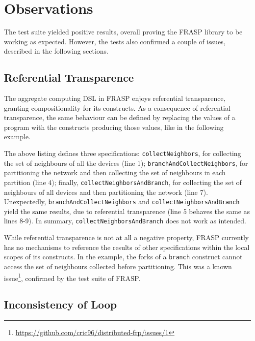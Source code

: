 
\section{Observations}
\label{section:verification:observations}

The test suite yielded positive results, overall proving the FRASP library to
be working as expected. However, the tests also confirmed a couple of issues,
described in the following sections.

\subsection{Referential Transparence}

The aggregate computing \ac{DSL} in FRASP enjoys referential transparence,
granting compositionality for its constructs. As a consequence of referential
transparence, the same behaviour can be defined by replacing the values of a
program with the constructs producing those values, like in the following
example.



The above listing defines three specifications: \texttt{collectNeighbors}, for
collecting the set of neighbours of all the devices (line 1);
\texttt{branchAndCollectNeighbors}, for partitioning the network and then
collecting the set of neighbours in each partition (line 4); finally,
\texttt{collectNeighborsAndBranch}, for collecting the set of neighbours of all
devices and then partitioning the network (line 7). Unexpectedly,
\texttt{branchAndCollectNeighbors} and \texttt{collectNeighborsAndBranch} yield
the same results, due to referential transparence (line 5 behaves the same as
lines 8-9). In summary, \texttt{collectNeighborsAndBranch} does not work as
intended.

While referential transparence is not at all a negative property, FRASP
currently has no mechanisms to reference the results of other specifications
within the local scopes of its constructs. In the example, the forks of a
\texttt{branch} construct cannot access the set of neighbours collected before
partitioning. This was a known issue\footnote{
\url{https://github.com/cric96/distributed-frp/issues/1}}, confirmed by the
test suite of FRASP.

\subsection{Inconsistency of Loop}

